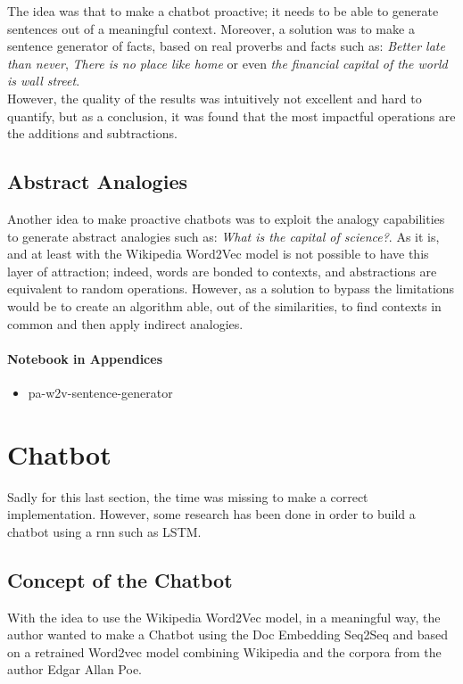 The idea was that to make a chatbot proactive; it needs to be able to generate sentences out of a meaningful context. Moreover, a solution was to make a sentence generator of facts, based on real proverbs and facts such as: \textit{Better late than never}, \textit{ There is no place like home} or even \textit{the financial capital of the world is wall street}.\\

However, the quality of the results was intuitively not excellent and hard to quantify, but as a conclusion, it was found that the most impactful operations are the additions and subtractions.

\subsection{Abstract Analogies}
\label{experiment:abstract-analogies}
Another idea to make proactive chatbots was to exploit the analogy capabilities to generate abstract analogies such as: \textit{What is the capital of science?}. As it is, and at least with the Wikipedia Word2Vec model is not possible to have this layer of attraction; indeed, words are bonded to contexts, and abstractions are equivalent to random operations. However, as a solution to bypass the limitations would be to create an algorithm able, out of the similarities, to find contexts in common and then apply indirect analogies.

\paragraph{Notebook in Appendices}
\begin{itemize}
    \setlength\itemsep{0em}
    \item pa-w2v-sentence-generator
\end{itemize}



\section{Chatbot}
Sadly for this last section, the time was missing to make a correct implementation. However, some research has been done in order to build a chatbot using a \gls{rnn} such as LSTM.

\subsection{Concept of the Chatbot}
With the idea to use the Wikipedia Word2Vec model, in a meaningful way, the author wanted to make a Chatbot using the Doc Embedding Seq2Seq and based on a retrained Word2vec model combining Wikipedia and the corpora from the author Edgar Allan Poe.

